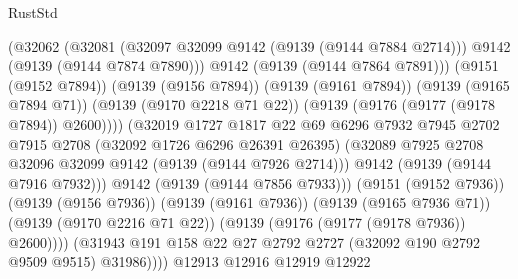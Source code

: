 \begin{lexlean}{RustStd}
\begin{coremodule}
                                    (@32062
                                      (@32081
                                        (@32097 @32099 @9142 (@9139 (@9144 @7884 @2714)))
                                        @9142
                                        (@9139 (@9144 @7874 @7890)))
                                      @9142
                                      (@9139 (@9144 @7864 @7891)))
                                    (@9151 (@9152 @7894))
                                    (@9139 (@9156 @7894))
                                    (@9139 (@9161 @7894))
                                    (@9139 (@9165 @7894 @71))
                                    (@9139 (@9170 @2218 @71 @22))
                                    (@9139 (@9176 (@9177 (@9178 @7894)) @2600))))
                                (@32019
                                  @1727
                                  @1817
                                  @22
                                  @69
                                  @6296
                                  @7932
                                  @7945
                                  @2702
                                  @7915
                                  @2708
                                  (@32092 @1726 @6296 @26391 @26395)
                                  (@32089
                                    @7925
                                    @2708
                                    @32096
                                    @32099
                                    @9142
                                    (@9139 (@9144 @7926 @2714)))
                                  @9142
                                  (@9139 (@9144 @7916 @7932)))
                                @9142
                                (@9139 (@9144 @7856 @7933)))
                              (@9151 (@9152 @7936))
                              (@9139 (@9156 @7936))
                              (@9139 (@9161 @7936))
                              (@9139 (@9165 @7936 @71))
                              (@9139 (@9170 @2216 @71 @22))
                              (@9139 (@9176 (@9177 (@9178 @7936)) @2600))))
                          (@31943
                            @191
                            @158
                            @22
                            @27
                            @2792
                            @2727
                            (@32092 @190 @2792 @9509 @9515)
                            @31986))))
                    @12913
                    @12916
                    @12919
                    @12922

\end{coremodule}
\end{lexlean}
